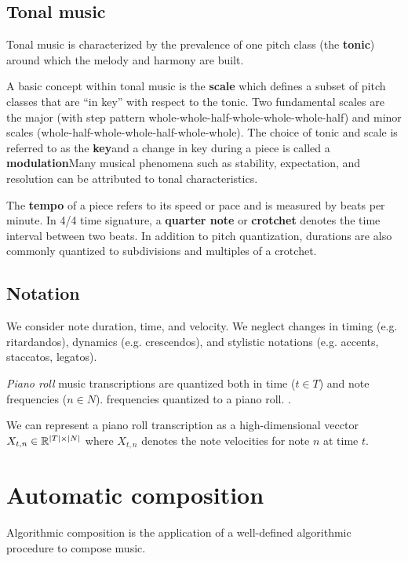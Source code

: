 \subsection{Tonal music}

Tonal music is characterized by the prevalence of one pitch class (the
\textbf{tonic}) around which the melody and harmony are built.

A basic concept
within tonal music is the \textbf{scale} which defines a subset of pitch
classes that are ``in key'' with respect to the tonic. Two fundamental scales
are the major (with step pattern whole-whole-half-whole-whole-whole-half) and
minor scales (whole-half-whole-whole-half-whole-whole). The choice of tonic and
scale is referred to as the \textbf{key}and a change in key during a piece is
called a \textbf{modulation}Many musical phenomena such as stability,
expectation, and resolution can be attributed to tonal characteristics.

The \textbf{tempo} of a piece refers to its speed or pace and is measured by
beats per minute. In 4/4 time signature, a \textbf{quarter note} or
\textbf{crotchet} denotes the time interval between two beats. In addition to
pitch quantization, durations are also commonly quantized to subdivisions and
multiples of a crotchet.

\subsection{Notation}

We consider note duration, time, and velocity. We neglect changes in timing
(e.g. ritardandos), dynamics (e.g. crescendos), and stylistic notations (e.g.
accents, staccatos, legatos).

\emph{Piano roll} music transcriptions are quantized both in time ($t \in T$)
and note frequencies ($n \in N$). frequencies quantized to a piano roll.
.

We can represent a piano roll transcription as a high-dimensional vecctor
$X_{t,n} \in \mathbb{R}^{|T| \times |N|}$ where $X_{t,n}$ denotes the note
velocities for note $n$ at time $t$.

\section{Automatic composition}

Algorithmic composition is the application of a well-defined algorithmic
procedure to compose music.

